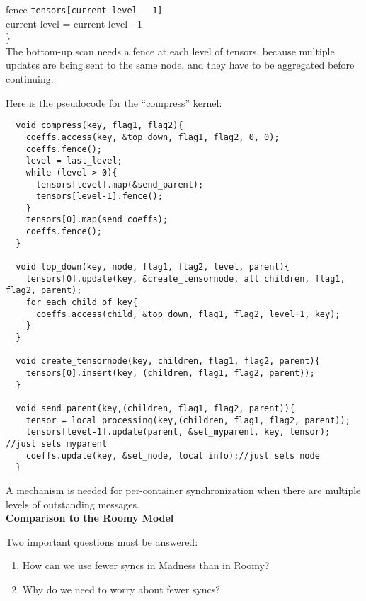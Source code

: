 \documentclass{article}
\begin{document}
\begin{enumerate}
\begin{enumerate}
fence {\tt tensors[current level - 1]}\\

current level = current level - 1\\

\}\\

The bottom-up scan needs a fence at each level of tensors, because multiple updates
are being sent to the same node, and they have to be aggregated before continuing.

Here is the pseudocode for the ``compress'' kernel:

\begin{verbatim}
  void compress(key, flag1, flag2){
    coeffs.access(key, &top_down, flag1, flag2, 0, 0);
    coeffs.fence();
    level = last_level;
    while (level > 0){
      tensors[level].map(&send_parent);
      tensors[level-1].fence();
    }
    tensors[0].map(send_coeffs);
    coeffs.fence();
  }

  void top_down(key, node, flag1, flag2, level, parent){
    tensors[0].update(key, &create_tensornode, all children, flag1, flag2, parent);
    for each child of key{
      coeffs.access(child, &top_down, flag1, flag2, level+1, key);
    }
  }

  void create_tensornode(key, children, flag1, flag2, parent){
    tensors[0].insert(key, (children, flag1, flag2, parent));
  }

  void send_parent(key,(children, flag1, flag2, parent)){
    tensor = local_processing(key,(children, flag1, flag2, parent));
    tensors[level-1].update(parent, &set_myparent, key, tensor); //just sets myparent
    coeffs.update(key, &set_node, local info);//just sets node
  }
\end{verbatim}
\end{enumerate}

A mechanism is needed for per-container synchronization when there are multiple levels of outstanding messages.\\

{\bf Comparison to the Roomy Model}

Two important questions must be answered:
\begin{enumerate}
\item How can we use fewer syncs in Madness than in Roomy?
\item Why do we need to worry about fewer syncs?
\end{enumerate}


\end{enumerate}
\end{document}
